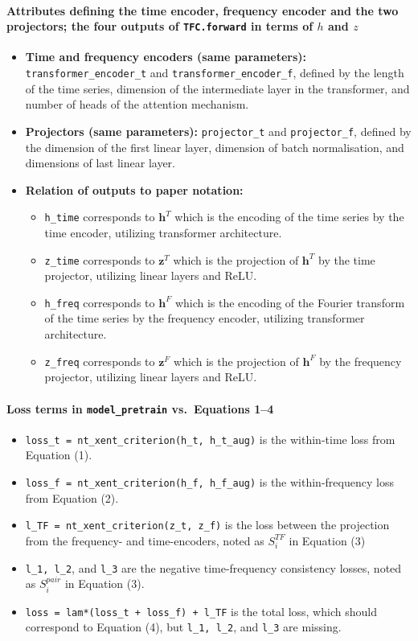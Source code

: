 \documentclass[a4paper,11pt]{article}
\newcommand{\code}[1]{\texttt{#1}}
\begin{document}
\paragraph{Attributes defining the time encoder, frequency encoder and the two projectors; the four outputs of \code{TFC.forward} in terms of $h$ and $z$}
\begin{itemize}
\item \textbf{Time and frequency encoders (same parameters):} \code{transformer\_encoder\_t} and \code{transformer\_encoder\_f}, defined by the length of the time series, dimension of the intermediate layer in the transformer, and number of heads of the attention mechanism.
\item \textbf{Projectors (same parameters):} \code{projector\_t} and \code{projector\_f}, defined by the dimension of the first linear layer, dimension of batch normalisation, and dimensions of last linear layer.
\item \textbf{Relation of outputs to paper notation:}
\begin{itemize}
\item \code{h\_time} corresponds to $\mathbf{h}^T$ which is the encoding of the time series by the time encoder, utilizing transformer architecture.
\item \code{z\_time} corresponds to $\mathbf{z}^T$ which is the projection of $\mathbf{h}^T$ by the time projector, utilizing linear layers and ReLU.
\item \code{h\_freq} corresponds to $\mathbf{h}^F$ which is the encoding of the Fourier transform of the time series by the frequency encoder, utilizing transformer architecture.
\item \code{z\_freq} corresponds to $\mathbf{z}^F$ which is the projection of $\mathbf{h}^F$ by the frequency projector, utilizing linear layers and ReLU.
\end{itemize}
\end{itemize}

\paragraph{Loss terms in \code{model\_pretrain} vs.\ Equations 1--4}
\begin{itemize}
\item \code{loss\_t = nt\_xent\_criterion(h\_t, h\_t\_aug)} is the within-time loss from Equation (1).
\item \code{loss\_f = nt\_xent\_criterion(h\_f, h\_f\_aug)} is the within-frequency loss from Equation (2).
\item \code{l\_TF = nt\_xent\_criterion(z\_t, z\_f)} is the loss between the projection from the frequency- and time-encoders, noted as $S_i^{TF}$ in Equation (3)
\item \code{l\_1, l\_2}, and \code{l\_3} are the negative time-frequency consistency losses, noted as $S_i^{pair}$ in Equation (3).
\item \code{loss = lam*(loss\_t + loss\_f) + l\_TF} is the total loss, which should correspond to Equation (4), but \code{l\_1, l\_2}, and \code{l\_3} are missing.
\end{itemize}
\end{document}
